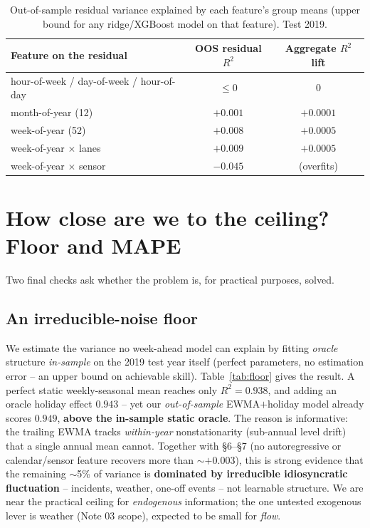 \documentclass[11pt]{article}
\begin{document}
\begin{table}[H]
\centering
\caption{Out-of-sample residual variance explained by each feature's group means
(upper bound for any ridge/XGBoost model on that feature). Test 2019.}
\label{tab:feat}
\begin{tabular}{lcc}
\toprule
Feature on the residual & OOS residual $R^2$ & Aggregate $R^2$ lift \\
\midrule
hour-of-week / day-of-week / hour-of-day & $\le 0$ & $0$ \\
month-of-year (12)            & $+0.001$ & $+0.0001$ \\
week-of-year (52)             & $+0.008$ & $+0.0005$ \\
week-of-year $\times$ lanes   & $+0.009$ & $+0.0005$ \\
week-of-year $\times$ sensor  & $-0.045$ & (overfits) \\
\bottomrule
\end{tabular}
\end{table}

\section{How close are we to the ceiling? Floor and MAPE}
\label{sec:floor}
Two final checks ask whether the problem is, for practical purposes, solved.

\subsection{An irreducible-noise floor}
We estimate the variance no week-ahead model can explain by fitting \emph{oracle}
structure \emph{in-sample} on the 2019 test year itself (perfect parameters, no
estimation error -- an upper bound on achievable skill). Table~\ref{tab:floor}
gives the result. A perfect static weekly-seasonal mean reaches only
$R^2=0.938$, and adding an oracle holiday effect $0.943$ -- yet our
\emph{out-of-sample} EWMA$+$holiday model already scores $0.949$, \textbf{above
the in-sample static oracle}. The reason is informative: the trailing EWMA tracks
\emph{within-year} nonstationarity (sub-annual level drift) that a single annual
mean cannot. Together with \S6--\S7 (no autoregressive or calendar/sensor feature
recovers more than $\sim$$+0.003$), this is strong evidence that the remaining
$\sim$5\% of variance is \textbf{dominated by irreducible idiosyncratic
fluctuation} -- incidents, weather, one-off events -- not learnable structure. We
are near the practical ceiling for \emph{endogenous} information; the one untested
exogenous lever is weather (Note 03 scope), expected to be small for \emph{flow}.
\end{document}
